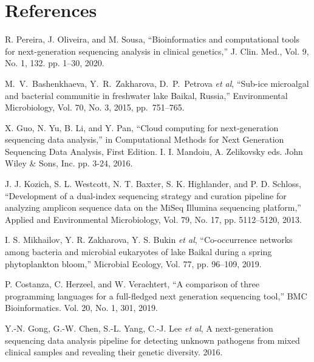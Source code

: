 \documentclass[a4paper]{jpconf}
\begin{document}
\section*{References}

\begin{thebibliography}{0}

 R. Pereira, J. Oliveira, and M. Sousa, ``Bioinformatics and computational tools for next-generation sequencing analysis in clinical genetics,'' J. Clin. Med., Vol. 9, No. 1, 132. pp. 1--30, 2020. 

 M.~V.~Bashenkhaeva, Y.~R.~Zakharova, D.~P.~Petrova \emph{et al}, ``Sub-ice microalgal and bacterial communitie in freshwater lake Baikal, Russia,'' Environmental Microbiology, Vol. 70, No. 3, 2015, pp.~751--765. 

 X. Guo, N. Yu, B. Li, and Y. Pan, ``Cloud computing for next-generation sequencing data analysis,'' in Computational Methods for Next Generation Sequencing Data Analysis, First Edition. I. I. Mandoiu, A. Zelikovsky eds. John Wiley \& Sons, Inc. pp. 3-24, 2016. \doi{}

 J. J. Kozich, S. L. Westcott, N. T. Baxter, S. K. Highlander, and P. D. Schloss, ``Development of a dual-index sequencing strategy and curation pipeline for analyzing amplicon sequence data on the MiSeq Illumina sequencing platform,'' Applied and Environmental Microbiology, Vol. 79, No. 17, pp. 5112–5120, 2013.

 I. S. Mikhailov, Y. R. Zakharova, Y. S. Bukin \emph{et al}, ``Co-occurrence networks among bacteria and microbial eukaryotes of lake Baikal during a spring phytoplankton bloom,'' Microbial Ecology, Vol. 77, pp. 96–109, 2019.  %


 P. Costanza, C. Herzeel, and W. Verachtert, ``A comparison of three
 programming languages for a full-fledged next generation sequencing tool,'' BMC Bioinformatics. Vol. 20, No. 1, 301, 2019. 

 Y.-N. Gong, G.-W. Chen, S.-L. Yang, C.-J. Lee \emph{et al}, A next-generation sequencing data analysis pipeline for detecting unknown pathogens from mixed clinical samples and revealing their genetic diversity. 2016. 


\end{thebibliography}
\end{document}
